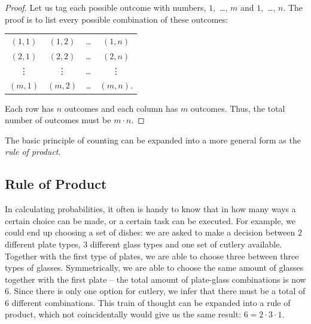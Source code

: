\documentclass[12pt,a4paper,leqno]{report}
\theoremstyle{plain}
\theoremstyle{definition}
\begin{document}
\begin{proof}
Let us tag each possible outcome with numbers, $1,$ \ldots, $m$ and $1,$ \ldots, $n$. The proof is to list every possible combination of these outcomes:

\begin{center}
\begin{tabular}{c c c c}
$(1,1)$ & $(1,2)$ & \ldots & $(1, n)$ \\
$(2,1)$ & $(2,2)$ & \ldots & $(2, n)$ \\
\vdots & \vdots & \ldots & \vdots \\
$(m,1)$ & $(m,2)$ & \ldots & $(m, n)$. 
\end{tabular}
\end{center}

Each row has $n$ outcomes and each column has $m$ outcomes. Thus, the total number of outcomes must be $m\cdot n$.
\end{proof}

The basic principle of counting can be expanded into a more general form as the \emph{rule of product}.

\subsection{Rule of Product}\label{ruleofproduct}

In calculating probabilities, it often is handy to know that in how many ways a certain choice can be made, or a certain task can be executed. For example, we could end up choosing a set of dishes: we are asked to make a decision between $2$ different plate types, $3$ different glass types and one set of cutlery available. Together with the first type of plates, we are able to choose three between three types of glasses. Symmetrically, we are able to choose the same amount of glasses together with the first plate -- the total amount of plate-glass combinations is now $6$. Since there is only one option for cutlery, we infer that there must be a total of $6$ different combinations. This train of thought can be expanded into a rule of product, which not coincidentally would give us the same result: $6=2\cdot 3 \cdot 1$.
\end{document}

